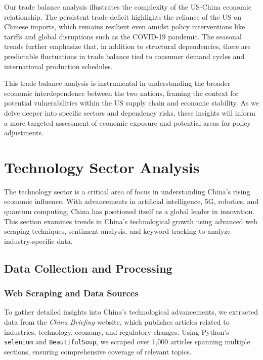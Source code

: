 \documentclass{article}
\begin{document}
Our trade balance analysis illustrates the complexity of the US-China economic relationship. The persistent trade deficit highlights the reliance of the US on Chinese imports, which remains resilient even amidst policy interventions like tariffs and global disruptions such as the COVID-19 pandemic. The seasonal trends further emphasize that, in addition to structural dependencies, there are predictable fluctuations in trade balance tied to consumer demand cycles and international production schedules.

This trade balance analysis is instrumental in understanding the broader economic interdependence between the two nations, framing the context for potential vulnerabilities within the US supply chain and economic stability. As we delve deeper into specific sectors and dependency risks, these insights will inform a more targeted assessment of economic exposure and potential areas for policy adjustments.

\section{Technology Sector Analysis}

The technology sector is a critical area of focus in understanding China’s rising economic influence. With advancements in artificial intelligence, 5G, robotics, and quantum computing, China has positioned itself as a global leader in innovation. This section examines trends in China’s technological growth using advanced web scraping techniques, sentiment analysis, and keyword tracking to analyze industry-specific data.

\subsection{Data Collection and Processing}

\subsubsection{Web Scraping and Data Sources}

To gather detailed insights into China's technological advancements, we extracted data from the \textit{China Briefing} website, which publishes articles related to industries, technology, economy, and regulatory changes. Using Python's \texttt{selenium} and \texttt{BeautifulSoup}, we scraped over 1,000 articles spanning multiple sections, ensuring comprehensive coverage of relevant topics.
\end{document}
